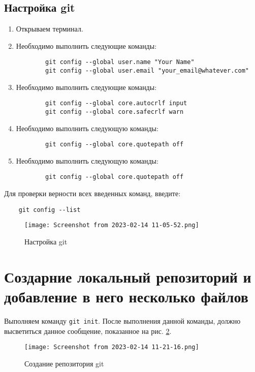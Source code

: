 \subsection{Настройка git}
\begin{enumerate}
	\item Открываем терминал.
	\item Необходимо выполнить следующие команды:
	\begin{verbatim}
		git config --global user.name "Your Name"
		git config --global user.email "your_email@whatever.com"
	\end{verbatim}
	\item Необходимо выполнить следующие команды:
	\begin{verbatim}
		git config --global core.autocrlf input
		git config --global core.safecrlf warn
	\end{verbatim}
	\item Необходимо выполнить следующую команды:
	\begin{verbatim}
		git config --global core.quotepath off
	\end{verbatim}
	\item Необходимо выполнить следующую команды:
	\begin{verbatim}
		git config --global core.quotepath off
	\end{verbatim}
\end{enumerate}
Для проверки верности всех введенных команд, введите:
\begin{verbatim}
	git config --list
\end{verbatim}
\begin{figure}[h!tp]
	\centering
	\texttt{[image: Screenshot from 2023-02-14 11-05-52.png]}
	\caption{Настройка git}
	\label{fig:git:config}
\end{figure}

\section{Создарние локальный репозиторий и добавление в него несколько файлов}

Выполняем команду \texttt{git init}.
После выполнения данной команды, должно высветиться данное сообщение, показанное на рис. \ref{fig:git:init}.
\begin{figure}[h!tp]
	\centering
	\texttt{[image: Screenshot from 2023-02-14 11-21-16.png]}
	\caption{Создание репозитория git}
	\label{fig:git:init}
\end{figure}

